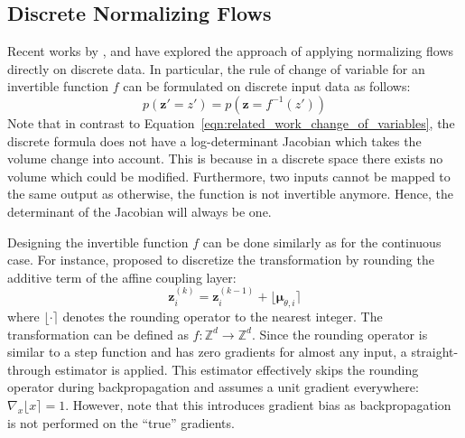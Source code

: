 \subsection{Discrete Normalizing Flows}
\label{sec:related_work_discrete_flows}

Recent works by \citet{TranDiscreteFlows}, \citet{IntegerNF} and \citet{IDF++} have explored the approach of applying normalizing flows directly on discrete data. In particular, the rule of change of variable for an invertible function $f$ can be formulated on discrete input data as follows:
\begin{equation}
    \label{eqn:change_of_variable_discrete}
    p(\bm{z}'=z') = p(\bm{z}=f^{-1}\left(z'\right))
\end{equation}
Note that in contrast to Equation~\ref{eqn:related_work_change_of_variables}, the discrete formula does not have a log-determinant Jacobian which takes the volume change into account. This is because in a discrete space there exists no volume which could be modified. 
Furthermore, two inputs cannot be mapped to the same output as otherwise, the function is not invertible anymore. 
Hence, the determinant of the Jacobian will always be one.

Designing the invertible function $f$ can be done similarly as for the continuous case. For instance, \citet{IntegerNF} proposed to discretize the transformation by rounding the additive term of the affine coupling layer:
\begin{equation}
    \bm{z}^{(k)}_{i} = \bm{z}^{(k-1)}_{i} + \big\lfloor\bm{\mu}_{\theta,i}\big\rceil
\end{equation}
where $\lfloor\cdot\rceil$ denotes the rounding operator to the nearest integer. 
The transformation can be defined as $f:\mathbb{Z}^{d}\to\mathbb{Z}^{d}$. 
Since the rounding operator is similar to a step function and has zero gradients for almost any input, a straight-through estimator \cite{STEGradientEstimator} is applied.
This estimator effectively skips the rounding operator during backpropagation and assumes a unit gradient everywhere: $\nabla_{x}\lfloor x\rceil = 1$.
However, note that this introduces gradient bias as backpropagation is not performed on the ``true'' gradients. 

